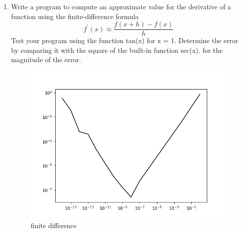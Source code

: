 \documentclass{article}
\begin{document}
\begin{enumerate}
\begin{enumerate}
\end{enumerate}
 
\pagebreak
\item Write a program to compute an approximate value for the derivative of a function
using the finite-difference formula
$$ f^{\prime}(x) \approx \frac{f(x+h)-f(x)}{h}$$
Test your program using the function tan(x) for x = 1. Determine the error by
comparing it with the square of the built-in function sec(x). 
for the magnitude of the error.
    \begin{figure}[hbt!]
        \centering
        \includegraphics[width=1\linewidth]{finite_diff.png}
        \caption{ finite difference}
        \label{fig: finite diffrence}
    \end{figure}
    


\end{enumerate}
\end{document}
